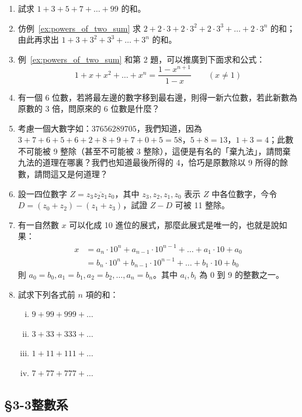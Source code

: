 \begin{enumerate}[1., leftmargin=2em]
  \item 試求 $1+3+5+7+\dots+99$ 的和。
  \item 仿例~\ref{ex:powers_of_two_sum} 求 $2 + 2 \cdot 3 + 2 \cdot 3^2 + 2 \cdot 3^3 + \dots + 2 \cdot 3^n$ 的和；由此再求出 $1 + 3 + 3^2 + 3^3 + \dots + 3^n$ 的和。
  \item 例~\ref{ex:powers_of_two_sum} 和第 2 題，可以推廣到下面求和公式：
  \begin{equation*}
    1 + x + x^2 + \dots + x^n = \frac{1 - x^{n+1}}{1 - x} \qquad (x \neq 1)
  \end{equation*}
  \item 有一個 6 位數，若將最左邊的數字移到最右邊，則得一新六位數，若此新數為原數的 3 倍，問原來的 6 位數是什麼？
  \item 考慮一個大數字如：$37656289705$，我們知道，因為 $3+7+6+5+6+2+8+9+7+0+5 = 58$，$5+8=13$，$1+3=4$；此數不可能被 9 整除（甚至不可能被 3 整除），這便是有名的「棄九法」，請問棄九法的道理在哪裏？我們也知道最後所得的 4，恰巧是原數除以 9 所得的餘數，請問這又是何道理？
  \item 設一四位數字 $Z = \overline{z_3 z_2 z_1 z_0}$，其中 $z_3, z_2, z_1, z_0$ 表示 $Z$ 中各位數字，今令 $D = (z_0 + z_2) - (z_1 + z_3)$，試證 $Z - D$ 可被 11 整除。
  \item 有一自然數 $x$ 可以化成 10 進位的展式，那麼此展式是唯一的，也就是說如果：
  \begin{align*}
    x &= a_n \cdot 10^n + a_{n-1} \cdot 10^{n-1} + \dots + a_1 \cdot 10 + a_0 \\
    &= b_n \cdot 10^n + b_{n-1} \cdot 10^{n-1} + \dots + b_1 \cdot 10 + b_0
  \end{align*}
  則 $a_0 = b_0, a_1 = b_1, a_2 = b_2, \dots, a_n = b_n$。其中 $a_i, b_i$ 為 0 到 9 的整數之一。
  \item 試求下列各式前 $n$ 項的和：
  \begin{enumerate}[(i)]
    \item $9 + 99 + 999 + \dots$
    \item $3 + 33 + 333 + \dots$
    \item $1 + 11 + 111 + \dots$
    \item $7 + 77 + 777 + \dots$
  \end{enumerate}
\end{enumerate}

\subsection{\S 3-3\quad 整數系}\label{sec:3-3}

